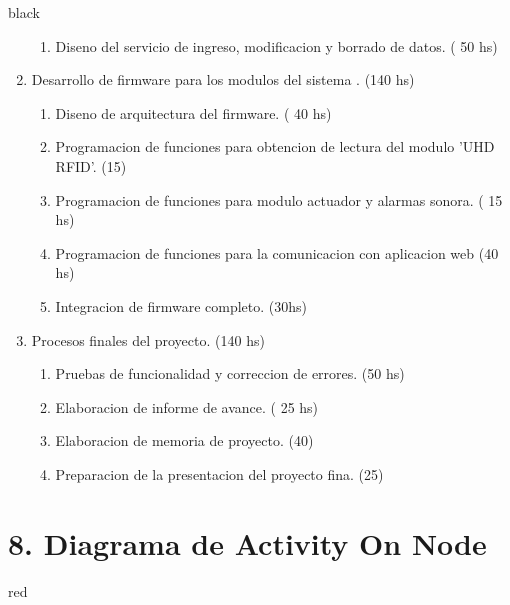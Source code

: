 \documentclass[
11pt, %
codirector, %
]{charter}
\begin{document}
\begin{consigna}{black}
\begin{enumerate}
\begin{enumerate}
	\item Diseno del servicio de ingreso, modificacion y borrado de datos. ( 50 hs)
	\end{enumerate}
\item Desarrollo de firmware para los modulos del sistema . (140 hs)
	\begin{enumerate}
	\item Diseno de arquitectura del firmware. ( 40 hs)
	\item Programacion de funciones para obtencion de lectura del modulo 'UHD RFID'. (15)
	\item Programacion de funciones para modulo actuador y alarmas sonora. ( 15 hs)
	\item Programacion de funciones para la comunicacion con aplicacion web (40 hs)
	\item Integracion de firmware completo. (30hs)
	\end{enumerate}
\item Procesos finales del proyecto. (140 hs)
	\begin{enumerate}
	\item Pruebas de funcionalidad y correccion de errores. (50 hs)
	\item Elaboracion de informe de avance. ( 25 hs)
	\item Elaboracion de memoria de proyecto. (40)
	\item Preparacion de la presentacion del proyecto fina. (25)
	\end{enumerate}
\end{enumerate}
\end{consigna}

\section{8. Diagrama de Activity On Node}
\label{sec:AoN}

\begin{consigna}{red}




\end{consigna}
\end{document}
